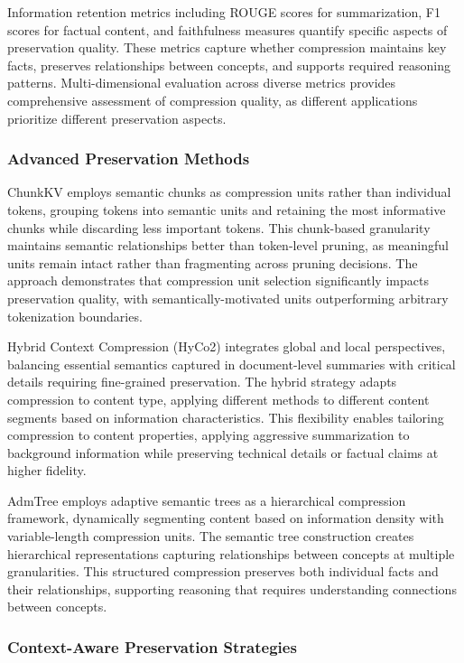 Information retention metrics including ROUGE scores for summarization, F1 scores for factual content, and faithfulness measures quantify specific aspects of preservation quality. These metrics capture whether compression maintains key facts, preserves relationships between concepts, and supports required reasoning patterns. Multi-dimensional evaluation across diverse metrics provides comprehensive assessment of compression quality, as different applications prioritize different preservation aspects.

\subsubsection{Advanced Preservation Methods}

ChunkKV employs semantic chunks as compression units rather than individual tokens, grouping tokens into semantic units and retaining the most informative chunks while discarding less important tokens. This chunk-based granularity maintains semantic relationships better than token-level pruning, as meaningful units remain intact rather than fragmenting across pruning decisions. The approach demonstrates that compression unit selection significantly impacts preservation quality, with semantically-motivated units outperforming arbitrary tokenization boundaries.

Hybrid Context Compression (HyCo2) integrates global and local perspectives, balancing essential semantics captured in document-level summaries with critical details requiring fine-grained preservation. The hybrid strategy adapts compression to content type, applying different methods to different content segments based on information characteristics. This flexibility enables tailoring compression to content properties, applying aggressive summarization to background information while preserving technical details or factual claims at higher fidelity.

AdmTree employs adaptive semantic trees as a hierarchical compression framework, dynamically segmenting content based on information density with variable-length compression units. The semantic tree construction creates hierarchical representations capturing relationships between concepts at multiple granularities. This structured compression preserves both individual facts and their relationships, supporting reasoning that requires understanding connections between concepts.

\subsubsection{Context-Aware Preservation Strategies}

